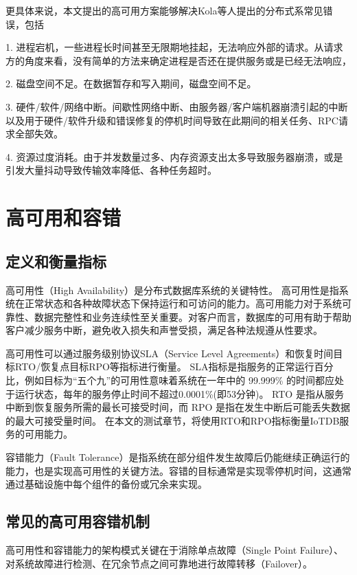 更具体来说，本文提出的高可用方案能够解决Kola\cite{kola2005faults}等人提出的分布式系常见错误，包括

1. 进程宕机，一些进程长时间甚至无限期地挂起，无法响应外部的请求。从请求方的角度来看，没有简单的方法来确定进程是否还在提供服务或是已经无法响应，

2. 磁盘空间不足。在数据暂存和写入期间，磁盘空间不足。

3. 硬件/软件/网络中断。间歇性网络中断、由服务器/客户端机器崩溃引起的中断以及用于硬件/软件升级和错误修复的停机时间导致在此期间的相关任务、RPC请求全部失效。

4. 资源过度消耗。由于并发数量过多、内存资源支出太多导致服务器崩溃，或是引发大量抖动导致传输效率降低、各种任务超时。


\section{高可用和容错}

\subsection{定义和衡量指标}

高可用性（High Availability）是分布式数据库系统的关键特性。
高可用性是指系统在正常状态和各种故障状态下保持运行和可访问的能力。高可用能力对于系统可靠性、数据完整性和业务连续性至关重要。对客户而言，数据库的可用有助于帮助客户减少服务中断，避免收入损失和声誉受损，满足各种法规遵从性要求。


高可用性可以通过服务级别协议SLA（Service Level Agreements）和恢复时间目标RTO/恢复点目标RPO等指标进行衡量。
SLA指标是指服务的正常运行百分比，例如目标为“五个九”的可用性意味着系统在一年中的 99.999\% 的时间都应处于运行状态，每年的服务停止时间不超过0.0001\%(即53分钟)。
RTO 是指从服务中断到恢复服务所需的最长可接受时间，而 RPO 是指在发生中断后可能丢失数据的最大可接受量时间。
在本文的测试章节，将使用RTO和RPO指标衡量IoTDB服务的可用能力。

容错能力（Fault Tolerance）是指系统在部分组件发生故障后仍能继续正确运行的能力\cite{lee1990fault}，也是实现高可用性的关键方法。容错的目标通常是实现零停机时间，这通常通过基础设施中每个组件的备份或冗余来实现。


\subsection{常见的高可用容错机制}

高可用性和容错能力的架构模式关键在于消除单点故障（Single Point Failure）、对系统故障进行检测、在冗余节点之间可靠地进行故障转移（Failover）。

